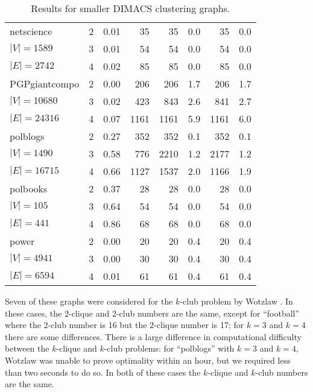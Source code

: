 \documentclass[letterpaper]{article}
\begin{document}
\begin{table}
\begin{tabular}{l c rr rr rr}
netscience  & 2&0.01&35&35&0.0&35&0.0\\
\hspace*{0.2em}\color{gray}$|V|{=}1589$& 3&0.01&54&54&0.0&54&0.0\\
\hspace*{0.2em}\color{gray}$|E|{=}2742$& 4&0.02&85&85&0.0&85&0.0\\
PGPgiantcompo  & 2&0.00&206&206&1.7&206&1.7\\
\hspace*{0.2em}\color{gray}$|V|{=}10680$& 3&0.02&423&843&2.6&841&2.7\\
\hspace*{0.2em}\color{gray}$|E|{=}24316$& 4&0.07&1161&1161&5.9&1161&6.0\\
polblogs  & 2&0.27&352&352&0.1&352&0.1\\
\hspace*{0.2em}\color{gray}$|V|{=}1490$& 3&0.58&776&2210&1.2&2177&1.2\\
\hspace*{0.2em}\color{gray}$|E|{=}16715$& 4&0.66&1127&1537&2.0&1166&1.9\\
polbooks  & 2&0.37&28&28&0.0&28&0.0\\
\hspace*{0.2em}\color{gray}$|V|{=}105$& 3&0.64&54&54&0.0&54&0.0\\
\hspace*{0.2em}\color{gray}$|E|{=}441$& 4&0.86&68&68&0.0&68&0.0\\
power  & 2&0.00&20&20&0.4&20&0.4\\
\hspace*{0.2em}\color{gray}$|V|{=}4941$& 3&0.00&30&30&0.4&30&0.4\\
\hspace*{0.2em}\color{gray}$|E|{=}6594$& 4&0.01&61&61&0.4&61&0.4\\
    \bottomrule
\end{tabular}
\caption{Results for smaller DIMACS clustering graphs.}\label{table:clustering}
\end{table}

Seven of these graphs were considered for the $k$-club problem by Wotzlaw .
In these cases, the $2$-clique and $2$-club numbers are the same, except for ``football'' where the
$2$-club number is 16 but the $2$-clique number is 17; for $k = 3$ and $k = 4$ there are some
differences. There is a large difference in computational difficulty between the $k$-clique and
$k$-club problems: for ``polblogs'' with $k = 3$ and $k = 4$, Wotzlaw was unable to prove optimality
within an hour, but we required less than two seconds to do so. In both of these cases the
$k$-clique and $k$-club numbers are the same.
\end{document}
